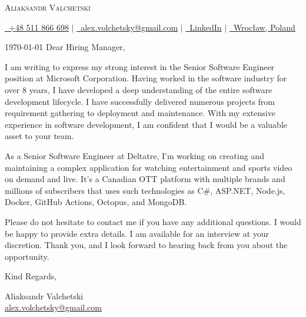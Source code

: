 \documentclass[12pt]{letter}
\makeatletter
\newcommand{\myname}{Aliaksandr Valchetski} %
\newcommand{\myemail}{alex.volchetsky@gmail.com} %
\newcommand{\myphone}{+48 511 866 698} %
\newcommand{\company}{Microsoft Corporation} %
\newcommand{\position}{Senior Software Engineer} %
\makeatother
\begin{document}
\AddToShipoutPictureBG{%
    \color{gr}
    \AtPageUpperLeft{\rule[-1.3in]{\paperwidth}{1.3in}}
}

\begin{center}
{\fontsize{28}{0}\selectfont\scshape \myname}

\href{tel:\myphone}{\raisebox{-0.1\height}\faPhone\ \underline{\myphone}} $|$ 
\href{mailto:\myemail}{\raisebox{-0.2\height}\faEnvelope\ \underline{\myemail}} $|$ 
\href{https://linkedin.com/in/valchetski}{\raisebox{-0.2\height}\faLinkedin\ \underline{LinkedIn}} $|$
\href{https://maps.app.goo.gl/fDMVWK2QSbCE37H89}{\raisebox{-0.2\height}\faMapMarker\ \underline{Wrocław, Poland}}

\end{center}

\vspace{0.2in}

\today
\bigbreak
\vspace{-0.1in}Dear Hiring Manager,
\bigbreak

\vspace{-0.1in}\setlength\parindent{24pt}
I am writing to express my strong interest in the \position{} position at \company.
Having worked in the software industry for over 8 years, I have developed a deep understanding of the entire software development lifecycle.
I have successfully delivered numerous projects from requirement gathering to deployment and maintenance.
With my extensive experience in software development, I am confident that I would be a valuable asset to your team.

As a Senior Software Engineer at Deltatre, I'm working on creating and maintaining a complex application for watching entertainment and sports video on demand and live.
It's a Canadian OTT platform with multiple brands and millions of subscribers that uses such technologies as C\#, ASP.NET, Node.js, Docker, GitHub Actions, Octopus, and MongoDB.


Please do not hesitate to contact me if you have any additional questions. 
I would be happy to provide extra details.
I am available for an interview at your discretion.
Thank you, and I look forward to hearing back from you about the opportunity.
\vspace{0.1in}
\vfill

\begin{flushright}
Kind Regards,

\myname\\
\href{mailto:\myemail}{\underline{\myemail}}\hfill
\end{flushright}
\end{document}
